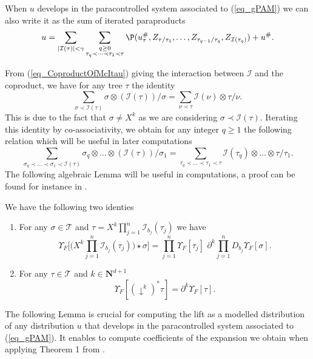 \documentclass[11pt]{preprint}
\newcommand{\mcI}{\mathcal{I}}
\newcommand{\mcT}{\mathcal{T}}
\def\eqref#1{(\ref{#1})}
\newcommand{\bfN}{\mathbf{N}}
\begin{document}
	
	When $u$ develops in the paracontrolled system associated to \eqref{eq_gPAM} we can also write it as the sum of iterated paraproducts 
	\begin{equation}\label{eq_gPamSystem_to_IteratedParap}
		u = \sum_{|\mcI(\tau)|<\gamma} \sum_{\substack{q\geq0 \\ \tau_q\prec\dots\prec\tau_1\prec\tau}} \P( u_\tau^\#, Z_{\tau/\tau_1},\dots, Z_{\tau_{q-1}/\tau_q}, Z_{\mcI(\tau_q)}   ) + u^\#. 
	\end{equation}
	


	From \eqref{eq_CoproductOfMcItau} giving the interaction between $\mcI$ and the coproduct, we have for any tree $\tau$ the identity $$ \sum_{\sigma\prec\mcI(\tau)} \sigma \otimes (\mcI(\tau))/\sigma  = \sum_{\nu\prec\tau}  \mcI(\nu)  \otimes \tau/\nu.  $$ This is due to the fact that $ \sigma \neq X^k $ as we are considering $ \sigma \prec\mcI(\tau) $. Iterating this identity by co-associativity, we obtain for any integer $q\geq1$ the following relation which will be useful in later computations 
	\begin{equation}\label{eq_CommutMotAvecMcI}
\sum_{\sigma_q\prec \dots \prec \sigma_1 \prec \mcI(\tau)}   \sigma_q \otimes \dots \otimes (\mcI(\tau))/\sigma_1  = \sum_{\tau_q\prec \dots \prec\tau_1\prec \tau}  \mcI(\tau_q) \otimes \dots \otimes \tau/\tau_1.
\end{equation}
	The following algebraic Lemma will be useful in computations, a proof can be found for instance in \cite[Proposition 2]{RenomrmalisedSpde}.
	\begin{lemma}\label{lem_ElemDiffMorphism}
		We have the following two identies  
		\begin{enumerate}
			\item For any $\sigma\in \mcT$ and $\tau=X^k\prod_{j=1}^n\mcI_{b_j}(\tau_j)$ we have
			$$
			\Upsilon_F\Big[ \Big(X^k \prod_{j=1}^n\mcI_{b_j}(\tau_j) \Big) \star \sigma  \Big] = \prod_{j=1}^n \Upsilon_F[\tau_j] \,\, \partial^k \prod_{j=1}^n D_{b_j} \Upsilon_F[\sigma] .
			$$
			\item For any $\tau\in\mcT$ and $k\in\bfN^{d+1}$
			\begin{equation}\label{eq_derivUpsilon}
			\Upsilon_F[(\downarrow^k)^*\tau] = \partial^k \Upsilon_F[\tau].
			\end{equation}
		\end{enumerate}
	\end{lemma}
	The following Lemma is crucial for computing the lift as a modelled distribution of any distribution $u$ that develops in the paracontrolled system associated to \eqref{eq_gPAM}. It enables to compute coefficients of the expansion we obtain when applying Theorem 1 from \cite{LocalExpansionsParacSystems}.
\end{document}
